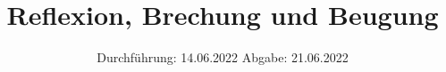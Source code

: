 

\subject{V400}
\title{Reflexion, Brechung und Beugung}
\date{%
  Durchführung: 14.06.2022
  \hspace{3em}
  Abgabe: 21.06.2022
}



\maketitle
\thispagestyle{empty}
\tableofcontents
\newpage






\printbibliography{}




